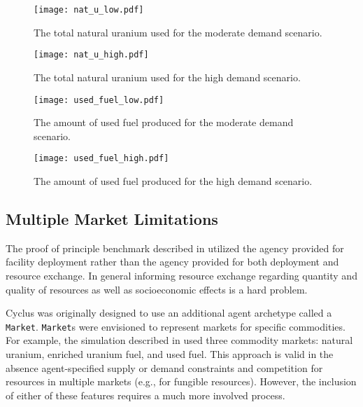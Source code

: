 \begin{figure}
\begin{center}
  \texttt{[image: nat\_u\_low.pdf]}
  \caption{The total natural uranium used for the moderate demand scenario.}
  \label{fig:nat_u_low}
\end{center}  
\end{figure}

\begin{figure}
\begin{center}
  \texttt{[image: nat\_u\_high.pdf]}
  \caption{The total natural uranium used for the high demand scenario.}
  \label{fig:nat_u_high}
\end{center}  
\end{figure}

\begin{figure}
  \begin{center}
    \texttt{[image: used\_fuel\_low.pdf]}
    \caption{The amount of used fuel produced for the moderate demand scenario.}
    \label{fig:used_fuel_low}
  \end{center}  
\end{figure}

\begin{figure}
  \begin{center}
    \texttt{[image: used\_fuel\_high.pdf]}
    \caption{The amount of used fuel produced for the high demand scenario.}
    \label{fig:used_fuel_high}
  \end{center}  
\end{figure}

\subsection{Multiple Market Limitations}\label{abm:abm:limits}

The proof of principle benchmark described in  utilized
the agency provided for facility deployment rather than the agency provided for
both deployment and resource exchange. In general informing resource exchange
regarding quantity and quality of resources as well as socioeconomic effects is
a hard problem.

Cyclus was originally designed to use an additional agent archetype called a
\texttt{Market}. \texttt{Market}s were envisioned to represent markets for
specific commodities. For example, the simulation described in
 used three commodity markets: natural uranium, enriched
uranium fuel, and used fuel. This approach is valid in the absence
agent-specified supply or demand constraints and competition for resources in
multiple markets (e.g., for fungible resources). However, the inclusion of
either of these features requires a much more involved process.


